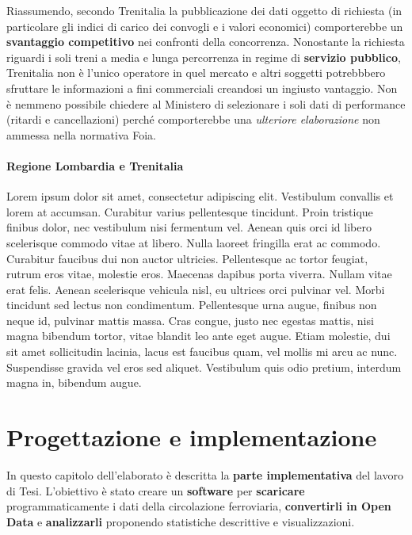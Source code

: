 \documentclass[12pt,italian]{report}
\begin{document}
Riassumendo, secondo Trenitalia la pubblicazione dei dati oggetto di
richiesta (in particolare gli indici di carico dei convogli e i valori
economici) comporterebbe un \textbf{svantaggio competitivo} nei
confronti della concorrenza.  Nonostante la richiesta riguardi i soli
treni a media e lunga percorrenza in regime di \textbf{servizio
    pubblico}, Trenitalia non è l'unico operatore in quel mercato e
altri soggetti potrebbbero sfruttare le informazioni a fini
commerciali creandosi un ingiusto vantaggio.  Non è nemmeno possibile
chiedere al Ministero di selezionare i soli dati di performance
(ritardi e cancellazioni) perché comporterebbe una \textit{ulteriore
    elaborazione} non ammessa nella normativa Foia.

\subsubsection{Regione Lombardia e Trenitalia}


Lorem ipsum dolor sit amet, consectetur adipiscing elit. Vestibulum
convallis et lorem at accumsan. Curabitur varius pellentesque
tincidunt. Proin tristique finibus dolor, nec vestibulum nisi
fermentum vel. Aenean quis orci id libero scelerisque commodo vitae at
libero. Nulla laoreet fringilla erat ac commodo. Curabitur faucibus
dui non auctor ultricies. Pellentesque ac tortor feugiat, rutrum eros
vitae, molestie eros. Maecenas dapibus porta viverra. Nullam vitae
erat felis. Aenean scelerisque vehicula nisl, eu ultrices orci
pulvinar vel. Morbi tincidunt sed lectus non condimentum. Pellentesque
urna augue, finibus non neque id, pulvinar mattis massa. Cras congue,
justo nec egestas mattis, nisi magna bibendum tortor, vitae blandit
leo ante eget augue. Etiam molestie, dui sit amet sollicitudin
lacinia, lacus est faucibus quam, vel mollis mi arcu ac
nunc. Suspendisse gravida vel eros sed aliquet. Vestibulum quis odio
pretium, interdum magna in, bibendum augue.

\chapter{Progettazione e implementazione}

In questo capitolo dell'elaborato è descritta la \textbf{parte
    implementativa} del lavoro di Tesi.  L'obiettivo è stato creare un
\textbf{software} per \textbf{scaricare} programmaticamente i dati
della circolazione ferroviaria, \textbf{convertirli in Open Data} e
\textbf{analizzarli} proponendo statistiche descrittive e
visualizzazioni.
\end{document}
